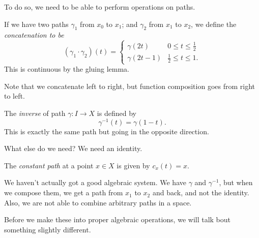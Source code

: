 \documentclass[a4paper]{article}
\begin{document}
To do so, we need to be able to perform operations on paths.
\begin{defi}
  If we have two paths $\gamma_1$ from $x_0$ to $x_1$; and $\gamma_2$ from $x_1$ to $x_2$, we define the \emph{concatenation to be}
  \[
    (\gamma_1\cdot \gamma_2)(t) =
    \begin{cases}
      \gamma(2t) & 0 \leq t \leq \frac{1}{2}\\
      \gamma(2t - 1) & \frac{1}{2} \leq t \leq 1.
    \end{cases}
  \]
  This is continuous by the gluing lemma.
\end{defi}
Note that we concatenate left to right, but function composition goes from right to left.
\begin{center}
\end{center}
\begin{defi}
  The \emph{inverse} of path $\gamma: I \to X$ is defined by
  \[
    \gamma^{-1}(t) = \gamma(1 - t).
  \]
  This is exactly the same path but going in the opposite direction.
\end{defi}

What else do we need? We need an identity.
\begin{defi}
  The \emph{constant path} at a point $x\in X$ is given by $c_x(t) = x$.
\end{defi}

We haven't actually got a good algebraic system. We have $\gamma$ and $\gamma^{-1}$, but when we compose them, we get a path from $x_1$ to $x_2$ and back, and not the identity. Also, we are not able to combine arbitrary paths in a space.

Before we make these into proper algebraic operations, we will talk bout something slightly different.
\end{document}
